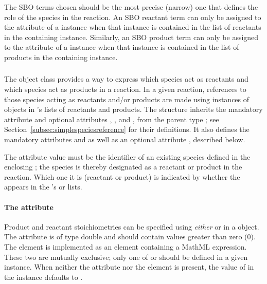 The SBO terms chosen should be the most precise (narrow) one that
defines the role of the species in the reaction.  An SBO reactant
term can only be assigned to the
 attribute of a \SpeciesReference instance when
that instance is contained in the list of reactants in the
containing \Reaction instance.  Similarly, an SBO product term can
only be assigned to the  attribute of a
\SpeciesReference instance when that instance is contained in the
list of products in the containing \Reaction instance.


\subsubsection{}
\label{subsec:speciesreference}

The \Reaction object class provides a way to express which species
act as reactants and which species act as products in a reaction.
In a given reaction, references to those species acting as
reactants and/or products are made using instances of
\SpeciesReference objects in \Reaction's lists of reactants and
products.  The \SpeciesReference structure inherits the mandatory
attribute  and optional attributes ,
, and , from the parent type
\SimpleSpeciesReference; see
Section~\ref{subsec:simplespeciesreference} for their definitions.
It also defines the mandatory attributes  and 
as well as an optional attribute , described below.

The  attribute value must be the
identifier of an existing species defined in the enclosing \Model;
the species is thereby designated as a reactant or product in the
reaction.  Which one it is (\ie reactant or product) is indicated
by whether the \SpeciesReference appears in the \Reaction's
 or  lists.


\paragraph{The  attribute}

Product and reactant stoichiometries can be specified using
\emph{either}  or 
in a \SpeciesReference object.  The 
attribute is of type double and should contain values greater than
zero (0).  The  element is implemented as
an element containing a MathML expression.  These two are
mutually exclusive; only one of  or
 should be defined in a given
\SpeciesReference instance.  When neither the attribute
  nor the element is present, the
value of  in the \SpeciesReference instance
defaults to .

